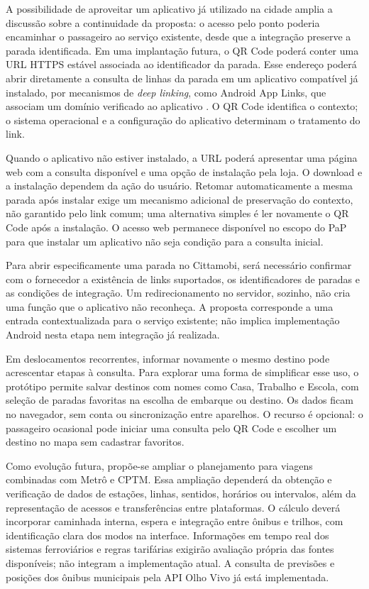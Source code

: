 \documentclass[12pt,oneside,a4paper,brazil,chapter=TITLE]{abntex2}
\begin{document}
A possibilidade de aproveitar um aplicativo já utilizado na cidade amplia a discussão sobre a continuidade da proposta: o acesso pelo ponto poderia encaminhar o passageiro ao serviço existente, desde que a integração preserve a parada identificada. Em uma implantação futura, o QR Code poderá conter uma URL HTTPS estável associada ao identificador da parada. Esse endereço poderá abrir diretamente a consulta de linhas da parada em um aplicativo compatível já instalado, por mecanismos de \textit{deep linking}, como Android App Links, que associam um domínio verificado ao aplicativo \citep{androidapplinks}. O QR Code identifica o contexto; o sistema operacional e a configuração do aplicativo determinam o tratamento do link.

Quando o aplicativo não estiver instalado, a URL poderá apresentar uma página web com a consulta disponível e uma opção de instalação pela loja. O download e a instalação dependem da ação do usuário. Retomar automaticamente a mesma parada após instalar exige um mecanismo adicional de preservação do contexto, não garantido pelo link comum; uma alternativa simples é ler novamente o QR Code após a instalação. O acesso web permanece disponível no escopo do PaP para que instalar um aplicativo não seja condição para a consulta inicial.

Para abrir especificamente uma parada no Cittamobi, será necessário confirmar com o fornecedor a existência de links suportados, os identificadores de paradas e as condições de integração. Um redirecionamento no servidor, sozinho, não cria uma função que o aplicativo não reconheça. A proposta corresponde a uma entrada contextualizada para o serviço existente; não implica implementação Android nesta etapa nem integração já realizada.

Em deslocamentos recorrentes, informar novamente o mesmo destino pode acrescentar etapas à consulta. Para explorar uma forma de simplificar esse uso, o protótipo permite salvar destinos com nomes como Casa, Trabalho e Escola, com seleção de paradas favoritas na escolha de embarque ou destino. Os dados ficam no navegador, sem conta ou sincronização entre aparelhos. O recurso é opcional: o passageiro ocasional pode iniciar uma consulta pelo QR Code e escolher um destino no mapa sem cadastrar favoritos.

Como evolução futura, propõe-se ampliar o planejamento para viagens combinadas com Metrô e CPTM. Essa ampliação dependerá da obtenção e verificação de dados de estações, linhas, sentidos, horários ou intervalos, além da representação de acessos e transferências entre plataformas. O cálculo deverá incorporar caminhada interna, espera e integração entre ônibus e trilhos, com identificação clara dos modos na interface. Informações em tempo real dos sistemas ferroviários e regras tarifárias exigirão avaliação própria das fontes disponíveis; não integram a implementação atual. A consulta de previsões e posições dos ônibus municipais pela API Olho Vivo já está implementada.
\end{document}
